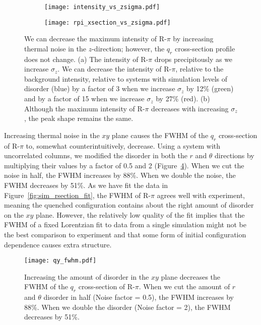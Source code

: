   \begin{figure}[!htb]
  \centering
  \begin{subfigure}{0.49\textwidth}
  \texttt{[image: intensity\_vs\_zsigma.pdf]}
  \caption{}\label{S-fig:intensity_vs_zsigma}
  \end{subfigure}
  \begin{subfigure}{0.49\textwidth}
  \texttt{[image: rpi\_xsection\_vs\_zsigma.pdf]}
  \caption{}\label{S-fig:rpi_xsection_vs_zsigma}
  \end{subfigure}
  \caption{We can decrease the maximum intensity of R-$\pi$ by increasing
  thermal noise in the $z$-direction; however, the $q_r$ cross-section profile does
  not change. (a) The intensity of R-$\pi$ drops precipitously as we increase
  $\sigma_z$. We can decrease the intensity of R-$\pi$, relative to the
  background intensity, relative to systems with simulation levels of disorder (blue)
  by a factor of 3 when we increase $\sigma_z$ by 12\% (green) and by a factor 
  of 15 when we increase $\sigma_z$ by 27\% (red). (b) Although the maximum intensity of R-$\pi$
  decreases with increasing $\sigma_z$, the peak shape remains the same.}\label{S-fig:znoise}
  \end{figure}
  
  Increasing thermal noise in the $xy$ plane causes the FWHM of the $q_r$
  cross-section of R-$\pi$ to, somewhat counterintuitively, decrease. Using a
  system with uncorrelated columns, we modified the disorder in both the $r$ and
  $\theta$ directions by multiplying their values by a factor of 0.5 and 2
  (Figure~\ref{S-fig:qy_fwhm}). When we cut the noise in half, the FWHM increases
  by 88\%. When we double the noise, the FWHM decreases by 51\%. As we have fit
  the data in Figure~\ref{fig:sim_rsection_fit}, the FWHM of R-$\pi$ agrees well
  with experiment, meaning the quenched configuration contains about the right
  amount of disorder on the $xy$ plane. However, the relatively low quality of
  the fit implies that the FWHM of a fixed Lorentzian fit to data from a single
  simulation might not be the best comparison to experiment and that some form of
  initial configuration dependence causes extra structure.

  \begin{figure}
  \centering
  \texttt{[image: qy\_fwhm.pdf]}
  \caption{Increasing the amount of disorder in the $xy$ plane decreases the
	  FWHM of the $q_r$ cross-section of R-$\pi$. When we cut the amount of $r$ and
	  $\theta$ disorder in half (Noise factor = 0.5), the FWHM increases by 88\%. When
	  we double the disorder (Noise factor = 2), the FWHM decreases by
	  51\%.}\label{S-fig:qy_fwhm}
  \end{figure} 
   
